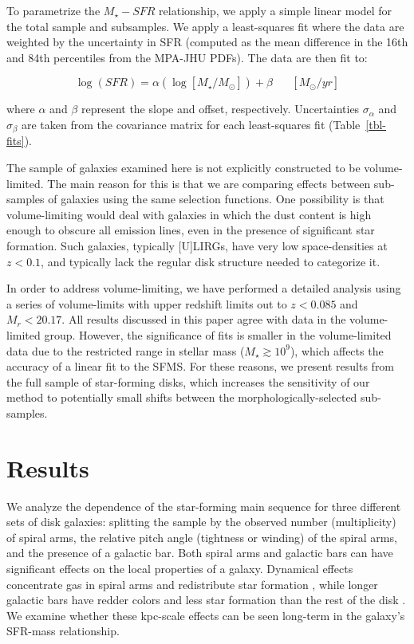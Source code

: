 \documentclass[useAMS,usenatbib]{mn2e}
\begin{document}
To parametrize the $M_\star-SFR$ relationship, we apply a simple linear model for the total sample and subsamples. We apply a least-squares fit where the data are weighted by the uncertainty in SFR (computed as the mean difference in the 16th and 84th percentiles from the MPA-JHU PDFs). The data are then fit to:

\begin{equation}
\log(SFR) = \alpha(\log[M_\star/M_\odot]) + \beta \hspace{20pt}[M_\odot/yr]
\label{eqn-linearfit}
\end{equation}

\noindent where $\alpha$ and $\beta$ represent the slope and offset, respectively. Uncertainties $\sigma_\alpha$ and $\sigma_\beta$ are taken from the covariance matrix for each least-squares fit (Table~\ref{tbl-fits}).


The sample of galaxies examined here is not explicitly constructed to be volume-limited. The main reason for this is that we are comparing effects between sub-samples of galaxies using the same selection functions. One possibility is that volume-limiting would deal with galaxies in which the dust content is high enough to obscure all emission lines, even in the presence of significant star formation. Such galaxies, typically [U]LIRGs, have very low space-densities at $z<0.1$, and typically lack the regular disk structure needed to categorize it. 

In order to address volume-limiting, we have performed a detailed analysis using a series of volume-limits with upper redshift limits out to $z<0.085$ and $M_r < 20.17$. All results discussed in this paper agree with data in the volume-limited group. However, the significance of fits is smaller in the volume-limited data due to the restricted range in stellar mass ($M_\star\gtrsim10^9$), which affects the accuracy of a linear fit to the SFMS. For these reasons, we present results from the full sample of star-forming disks, which increases the sensitivity of our method to potentially small shifts between the morphologically-selected sub-samples. 


\section{Results} \label{sec-results}

We analyze the dependence of the star-forming main sequence for three different sets of disk galaxies: splitting the sample by the observed number (multiplicity) of spiral arms, the relative pitch angle (tightness or winding) of the spiral arms, and the presence of a galactic bar. Both spiral arms and galactic bars can have significant effects on the local properties of a galaxy. Dynamical effects concentrate gas in spiral arms and redistribute star formation \citep{elm86,foy10}, while longer galactic bars have redder colors and less star formation than the rest of the disk \citep{hoy11,mas12a}. We examine whether these kpc-scale effects can be seen long-term in the galaxy's SFR-mass relationship. 
\end{document}
